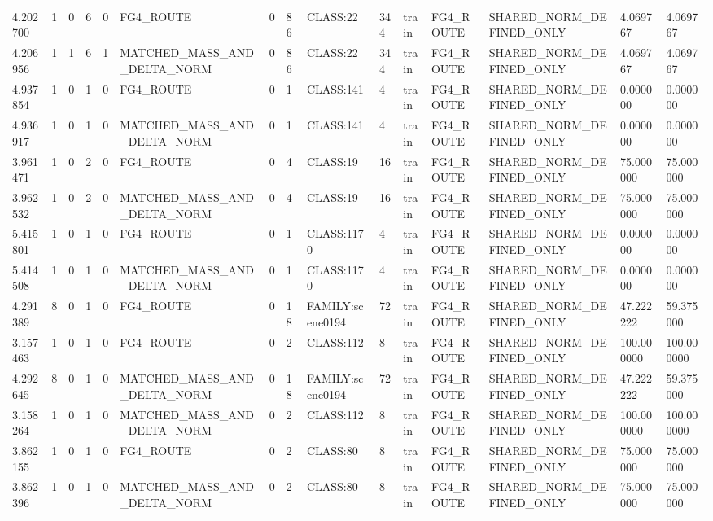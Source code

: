 \begin{tabular}{lllllllllllllll}
4.202700 & 1 & 0 & 6 & 0 & FG4\_ROUTE & 0 & 86 & CLASS:22 & 344 & train & FG4\_ROUTE & SHARED\_NORM\_DEFINED\_ONLY & 4.069767 & 4.069767 \\
4.206956 & 1 & 1 & 6 & 1 & MATCHED\_MASS\_AND\_DELTA\_NORM & 0 & 86 & CLASS:22 & 344 & train & FG4\_ROUTE & SHARED\_NORM\_DEFINED\_ONLY & 4.069767 & 4.069767 \\
4.937854 & 1 & 0 & 1 & 0 & FG4\_ROUTE & 0 & 1 & CLASS:141 & 4 & train & FG4\_ROUTE & SHARED\_NORM\_DEFINED\_ONLY & 0.000000 & 0.000000 \\
4.936917 & 1 & 0 & 1 & 0 & MATCHED\_MASS\_AND\_DELTA\_NORM & 0 & 1 & CLASS:141 & 4 & train & FG4\_ROUTE & SHARED\_NORM\_DEFINED\_ONLY & 0.000000 & 0.000000 \\
3.961471 & 1 & 0 & 2 & 0 & FG4\_ROUTE & 0 & 4 & CLASS:19 & 16 & train & FG4\_ROUTE & SHARED\_NORM\_DEFINED\_ONLY & 75.000000 & 75.000000 \\
3.962532 & 1 & 0 & 2 & 0 & MATCHED\_MASS\_AND\_DELTA\_NORM & 0 & 4 & CLASS:19 & 16 & train & FG4\_ROUTE & SHARED\_NORM\_DEFINED\_ONLY & 75.000000 & 75.000000 \\
5.415801 & 1 & 0 & 1 & 0 & FG4\_ROUTE & 0 & 1 & CLASS:1170 & 4 & train & FG4\_ROUTE & SHARED\_NORM\_DEFINED\_ONLY & 0.000000 & 0.000000 \\
5.414508 & 1 & 0 & 1 & 0 & MATCHED\_MASS\_AND\_DELTA\_NORM & 0 & 1 & CLASS:1170 & 4 & train & FG4\_ROUTE & SHARED\_NORM\_DEFINED\_ONLY & 0.000000 & 0.000000 \\
4.291389 & 8 & 0 & 1 & 0 & FG4\_ROUTE & 0 & 18 & FAMILY:scene0194 & 72 & train & FG4\_ROUTE & SHARED\_NORM\_DEFINED\_ONLY & 47.222222 & 59.375000 \\
3.157463 & 1 & 0 & 1 & 0 & FG4\_ROUTE & 0 & 2 & CLASS:112 & 8 & train & FG4\_ROUTE & SHARED\_NORM\_DEFINED\_ONLY & 100.000000 & 100.000000 \\
4.292645 & 8 & 0 & 1 & 0 & MATCHED\_MASS\_AND\_DELTA\_NORM & 0 & 18 & FAMILY:scene0194 & 72 & train & FG4\_ROUTE & SHARED\_NORM\_DEFINED\_ONLY & 47.222222 & 59.375000 \\
3.158264 & 1 & 0 & 1 & 0 & MATCHED\_MASS\_AND\_DELTA\_NORM & 0 & 2 & CLASS:112 & 8 & train & FG4\_ROUTE & SHARED\_NORM\_DEFINED\_ONLY & 100.000000 & 100.000000 \\
3.862155 & 1 & 0 & 1 & 0 & FG4\_ROUTE & 0 & 2 & CLASS:80 & 8 & train & FG4\_ROUTE & SHARED\_NORM\_DEFINED\_ONLY & 75.000000 & 75.000000 \\
3.862396 & 1 & 0 & 1 & 0 & MATCHED\_MASS\_AND\_DELTA\_NORM & 0 & 2 & CLASS:80 & 8 & train & FG4\_ROUTE & SHARED\_NORM\_DEFINED\_ONLY & 75.000000 & 75.000000 \\

\end{tabular}
